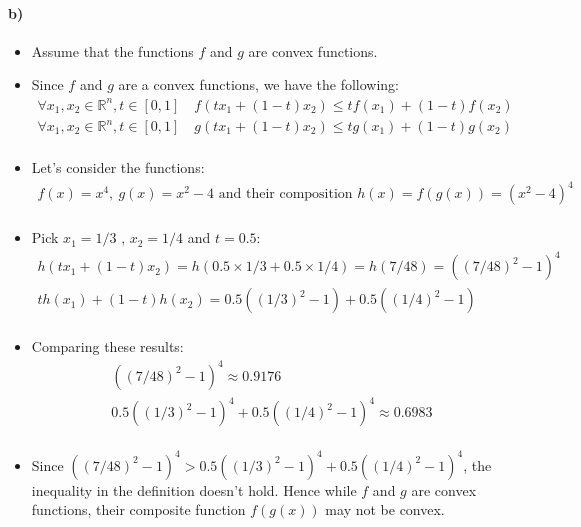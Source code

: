 \documentclass[12pt]{article}
\begin{document}
\paragraph*{b)}
\begin{itemize}
            \item Assume that the functions $f$ and $g$ are convex functions.
            \item Since $f$ and $g$ are a convex functions, we have the following:
            \begin{equation*}
                \begin{split}
                    \forall x_1, x_2 \in \mathbb{R}^n, t \in [0, 1] \quad f(tx_1 + (1 - t)x_2) \le tf(x_1) + (1 - t)f (x_2)\\
                    \forall x_1, x_2 \in \mathbb{R}^n, t \in [0, 1] \quad g(tx_1 + (1 - t)x_2) \le tg(x_1) + (1 - t)g (x_2)\\
                \end{split}
            \end{equation*}
            \item Let's consider the functions: 
            \begin{equation*}
                \begin{split}
                    f(x) = x^4, \ g(x) = x^2 - 4 \text{ and their composition } h(x) = f(g(x)) = (x^2-4)^4\\
                \end{split}
            \end{equation*}
            \item Pick $x_1 = 1/3$ , $x_2 = 1/4$ and $t = 0.5$:
            \begin{equation*}
                \begin{split}
                    h(tx_1+(1 - t)x_2) = h(0.5 \times 1/3 + 0.5 \times 1/4)=h(7/48)=((7/48)^2 - 1)^4\\
                    th(x_1)+(1-t)h(x_2)=0.5((1/3)^2-1) + 0.5((1/4)^2-1)\\
                \end{split}
            \end{equation*}
            \item Comparing these results:
            \begin{equation*}
                \begin{split}
                    ((7/48)^2 - 1)^4 \approx 0.9176\\
                    0.5((1/3)^2-1)^4 + 0.5((1/4)^2-1)^4 \approx 0.6983\\
                \end{split}
            \end{equation*}
            \item Since $((7/48)^2 - 1)^4 > 0.5((1/3)^2-1)^4 + 0.5((1/4)^2-1)^4$, the inequality in the definition doesn't hold. Hence while $f$ and $g$ are convex functions, their composite function $f(g(x))$ may not be convex.
\end{itemize}{}
\end{document}

